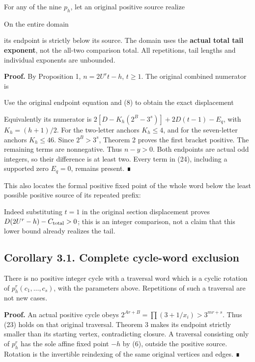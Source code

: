 For any of the nine \(p_h\), let an original positive source realize


On the entire domain


its endpoint is strictly below its source. The domain uses the
\textbf{actual total tail exponent}, not the all-two comparison total.
All repetitions, tail lengths and individual exponents are unbounded.

\textbf{Proof.} By Proposition 1, \(n=2U^r t-h\), \(t\ge1\). The
original combined numerator is


Use the original endpoint equation and (8) to obtain the exact
displacement


Equivalently its numerator is \(2[D-K_h(2^B-3^s)]+2D(t-1)-E_q\), with
\(K_h=(h+1)/2\). For the two-letter anchors \(K_h\le4\), and for the
seven-letter anchors \(K_h\le46\). Since \(2^B>3^s\), Theorem 2 proves
the first bracket positive. The remaining terms are nonnegative. Thus
\(n-y>0\). Both endpoints are actual odd integers, so their difference
is at least two. Every term in (24), including a supported zero
\(E_q=0\), remains present. ∎

This also locates the formal positive fixed point of the whole word
below the least possible positive source of its repeated prefix:


Indeed substituting \(t=1\) in the original section displacement proves
\(D(2U^r-h)-C_{\rm total}>0\); this is an integer comparison, not a
claim that this lower bound already realizes the tail.

\subsection{Corollary 3.1. Complete cycle-word exclusion}

There is no positive integer cycle with a traversal word which is a
cyclic rotation of \(p_h^r(c_1,\ldots,c_s)\), with the parameters above.
Repetitions of such a traversal are not new cases.

\textbf{Proof.} An actual positive cycle obeys
\(2^{Ar+B}=\prod(3+1/x_i)>3^{mr+s}\). Thus (23) holds on that original
traversal. Theorem 3 makes its endpoint strictly smaller than its
starting vertex, contradicting closure. A traversal consisting only of
\(p_h^r\) has the sole affine fixed point \(-h\) by (6), outside the
positive source. Rotation is the invertible reindexing of the same
original vertices and edges. ∎

